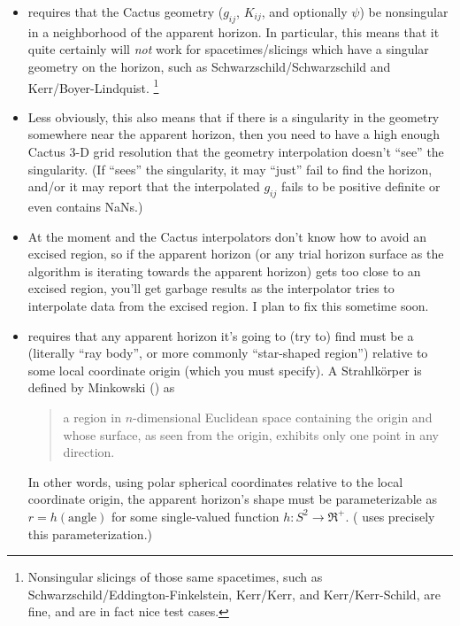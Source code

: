 \begin{itemize}
\item	{} requires that the Cactus geometry
	($g_{ij}$, $K_{ij}$, and optionally $\psi$) be nonsingular
	in a neighborhood of the apparent horizon.  In particular,
	this means that it quite certainly will {\em not\/} work for
	spacetimes/slicings which have a singular geometry on the
	horizon, such as Schwarzschild/Schwarzschild and
	Kerr/Boyer-Lindquist.%
\footnote{%
	 Nonsingular slicings of those same spacetimes,
	 such as Schwarzschild/Eddington-Finkelstein,
	 Kerr/Kerr, and Kerr/Kerr-Schild, are fine, and
	 are in fact nice test cases.
	 }%
\item	Less obviously, this also means that if there is a
	singularity in the geometry somewhere near the apparent
	horizon, then you need to have a high enough Cactus 3-D grid
	resolution that the geometry interpolation doesn't ``see''
	the singularity.  (If  ``sees'' the
	singularity, it may ``just'' fail to find the horizon,
	and/or it may report that the interpolated $g_{ij}$ fails
	to be positive definite or even contains NaNs.)
\item	At the moment  and the Cactus interpolators
	don't know how to avoid an excised region, so if the apparent horizon
	(or any trial horizon surface as the algorithm is iterating
	towards the apparent horizon) gets too close to an excised
	region, you'll get garbage results as the interpolator tries
	to interpolate data from the excised region.  I plan to fix
	this sometime soon.
\item	{} requires that any apparent horizon
	it's going to (try to) find must be a 
	(literally ``ray body'', or more commonly ``star-shaped region'')
	relative to some local coordinate origin (which you must specify).
	A Strahlk\"{o}rper is defined by Minkowski
	(\cite[p.~108]{AHFinderDirect/Schroeder86})
	as
	   \begin{quote}
	   a region in $n$-dimensional Euclidean space containing the
	   origin and whose surface, as seen from the origin, exhibits
	   only one point in any direction.
	   \end{quote}
	In other words, using polar spherical coordinates relative
	to the local coordinate origin, the apparent horizon's shape
	must be parameterizable as $r = h(\text{angle})$ for some
	single-valued function $h: S^2 \to \Re^+$.  (
	uses precisely this parameterization.)
\end{itemize}

